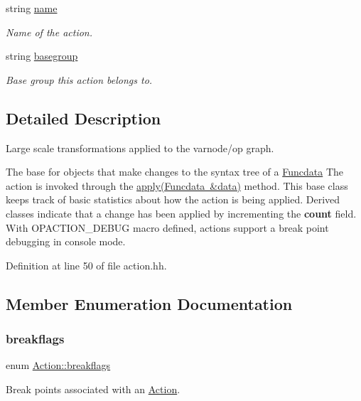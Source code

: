 \begin{DoxyCompactItemize}
string \mbox{\hyperlink{class_action_ab73b13cffdb1b32679cf46b783c7e404}{name}}
\begin{DoxyCompactList}\small\item\em Name of the action. \end{DoxyCompactList}\item 
string \mbox{\hyperlink{class_action_a5b149636900891c8b1f1ff1ab187e1d0}{basegroup}}
\begin{DoxyCompactList}\small\item\em Base group this action belongs to. \end{DoxyCompactList}\end{DoxyCompactItemize}


\subsection{Detailed Description}
Large scale transformations applied to the varnode/op graph. 

The base for objects that make changes to the syntax tree of a \mbox{\hyperlink{class_funcdata}{Funcdata}} The action is invoked through the \mbox{\hyperlink{class_action_aac1c3999d6c685b15f5d9765a4d04173}{apply(\+Funcdata \&data)}} method. This base class keeps track of basic statistics about how the action is being applied. Derived classes indicate that a change has been applied by incrementing the {\bfseries{count}} field. With O\+P\+A\+C\+T\+I\+O\+N\+\_\+\+D\+E\+B\+UG macro defined, actions support a break point debugging in console mode. 

Definition at line 50 of file action.\+hh.



\subsection{Member Enumeration Documentation}
\mbox{\label{class_action_a4c96e5f79efa1824d4d72a3cab8f4ecb}} 
\subsubsection{\texorpdfstring{breakflags}{breakflags}}
{\footnotesize\ttfamily enum \mbox{\hyperlink{class_action_a4c96e5f79efa1824d4d72a3cab8f4ecb}{Action\+::breakflags}}}



Break points associated with an \mbox{\hyperlink{class_action}{Action}}. 

